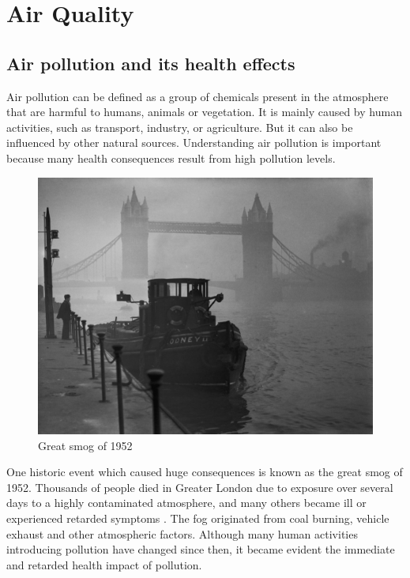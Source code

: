 \section{Air Quality}
\subsection{Air pollution and its health effects}
Air pollution can be defined as a group of chemicals present in the atmosphere that are harmful to humans, animals or vegetation. It is mainly caused by human activities, such as transport, industry, or agriculture. But it can also be influenced by other natural sources. Understanding air pollution is important because many health consequences result from high pollution levels. 
\begin{figure}[h]
  \centering
  \includegraphics[scale=.8]{images/great_smog.jpg}
  \caption[Great smog of 1952]{Great smog of 1952 \cite{ElliotWagland2013}}
  \label{fig:interaction_design}
\end{figure}

One historic event which caused huge consequences is known as the great smog of 1952. Thousands of people died in Greater London due to exposure over several days to a highly contaminated atmosphere, and many others became ill or experienced retarded symptoms \cite{Bell2008}. The fog originated from coal burning, vehicle exhaust and other atmospheric factors. Although many human activities introducing pollution have changed since then, it became evident the immediate and retarded health impact of pollution. 

